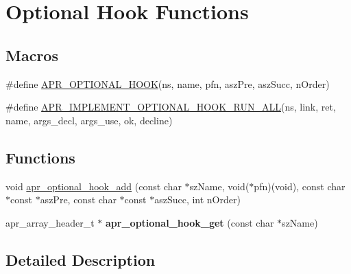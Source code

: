 \hypertarget{group___a_p_r___util___o_p_t___h_o_o_k}{\section{Optional Hook Functions}
\label{group___a_p_r___util___o_p_t___h_o_o_k}
}
\subsection*{Macros}
\begin{DoxyCompactItemize}
\item 
\#define \hyperlink{group___a_p_r___util___o_p_t___h_o_o_k_ga808d07f9a3e5df6517ba027972c79e4f}{A\-P\-R\-\_\-\-O\-P\-T\-I\-O\-N\-A\-L\-\_\-\-H\-O\-O\-K}(ns, name, pfn, asz\-Pre, asz\-Succ, n\-Order)
\item 
\#define \hyperlink{group___a_p_r___util___o_p_t___h_o_o_k_ga3e6fa7b8e9ce140b26d8f6ce34e6ae82}{A\-P\-R\-\_\-\-I\-M\-P\-L\-E\-M\-E\-N\-T\-\_\-\-O\-P\-T\-I\-O\-N\-A\-L\-\_\-\-H\-O\-O\-K\-\_\-\-R\-U\-N\-\_\-\-A\-L\-L}(ns, link, ret, name, args\-\_\-decl, args\-\_\-use, ok, decline)
\end{DoxyCompactItemize}
\subsection*{Functions}
\begin{DoxyCompactItemize}
\item 
void \hyperlink{group___a_p_r___util___o_p_t___h_o_o_k_gaff32812046580ae53b0368918374a3b6}{apr\-\_\-optional\-\_\-hook\-\_\-add} (const char $\ast$sz\-Name, void($\ast$pfn)(void), const char $\ast$const $\ast$asz\-Pre, const char $\ast$const $\ast$asz\-Succ, int n\-Order)
\item 
\hypertarget{group___a_p_r___util___o_p_t___h_o_o_k_gae7cfa7b32c41fb38eb19f0bba85abfeb}{apr\-\_\-array\-\_\-header\-\_\-t $\ast$ {\bfseries apr\-\_\-optional\-\_\-hook\-\_\-get} (const char $\ast$sz\-Name)}\label{group___a_p_r___util___o_p_t___h_o_o_k_gae7cfa7b32c41fb38eb19f0bba85abfeb}

\end{DoxyCompactItemize}


\subsection{Detailed Description}


